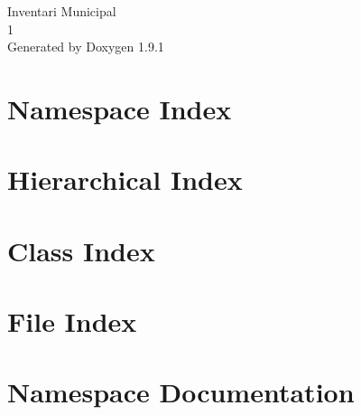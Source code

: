\let\mypdfximage\pdfximage\def\pdfximage{\immediate\mypdfximage}\documentclass[twoside]{book}
\newcommand{\+}{\discretionary{\mbox{\scriptsize$\hookleftarrow$}}{}{}}
\newcommand{\clearemptydoublepage}{%
  \newpage{\pagestyle{empty}\cleardoublepage}%
}
\begin{document}
\raggedbottom

\hypersetup{pageanchor=false,
             bookmarksnumbered=true,
             pdfencoding=unicode
            }
\begin{titlepage}
\vspace*{7cm}
\begin{center}%
{\Large Inventari Municipal \\[1ex]\large 1 }\\
\vspace*{1cm}
{\large Generated by Doxygen 1.9.1}\\
\end{center}
\end{titlepage}
\clearemptydoublepage
{}
\tableofcontents
\clearemptydoublepage
{}
\hypersetup{pageanchor=true}

\chapter{Namespace Index}

\chapter{Hierarchical Index}

\chapter{Class Index}

\chapter{File Index}

\chapter{Namespace Documentation}















\end{document}
